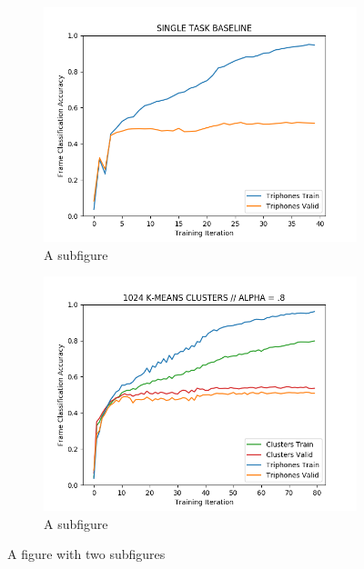 \documentclass[final]{beamer} %
\begin{document}
\begin{frame}
\begin{columns}
\begin{column}{0.22\textwidth}
{        \begin{figure}
          \centering
          \begin{subfigure}{.5\textwidth}
            \centering
            \includegraphics[width=.95\linewidth]{figs/baseline.png}
            \caption{A subfigure}
            \label{fig:sub1}
          \end{subfigure}%
          \begin{subfigure}{.5\textwidth}
            \centering
            \includegraphics[width=.95\linewidth]{figs/1024-clusters.png}
            \caption{A subfigure}
            \label{fig:sub2}
          \end{subfigure}
          \caption{A figure with two subfigures}
          \label{fig:test}
        \end{figure}
        
}
\end{column}
\end{columns}
\end{frame}
\end{document}
